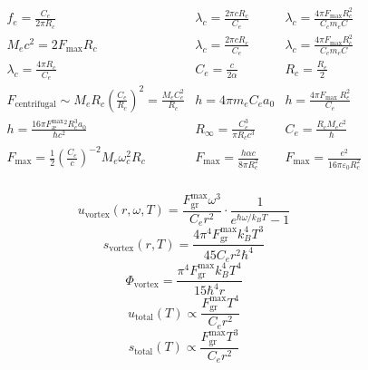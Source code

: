 \begin{gather*}
    \begin{array}{ccc}
            f_e = \frac{C_e}{2 \pi R_c} & \lambda_c = \frac{2 \pi c R_c}{C_e} & \lambda_c = \frac{4 \pi F_{\max } R_c^2}{C_e m_e C} \\
            M_e c^2 = 2 F_{\max } R_c & \lambda_c = \frac{2 \pi c R_c}{C_e} & \lambda_c = \frac{4 \pi F_{\max } R_c^2}{C_e m_e C} \\
            \lambda_c = \frac{4 \pi R_c}{C_e} & C_e = \frac{c}{2 \alpha} & R_c = \frac{R_e}{2} \\
            F_\text{centrifugal} \sim M_e R_c \left(\frac{C_e}{R_c}\right)^2 = \frac{M_e C_e^2}{R_c} & h = 4 \pi m_e C_e a_0 & h = \frac{4 \pi F_\text {max } R_e^2}{C_e} \\
            h = \frac{16 \pi F^{\text{max}}_{\text{\ae}}^2 R_c^3 a_0}{\hbar c^2} & R_\infty = \frac{C_e^3}{\pi R_c c^3} & C_e = \frac{R_c M_e c^2}{\hbar} \\
            F_{\max} = \frac{1}{2} \left( \frac{C_e}{c} \right)^{-2} M_e \omega_c^2 R_c & F_{\max} = \frac{h \alpha c}{8 \pi R_c^2} & F_{\max} = \frac{e^2}{16 \pi \varepsilon_0 R_c^2} \\
    \end{array}
\end{gather*}

\begin{equation*}
    u_\text{vortex}(r, \omega, T) = \frac{F^{\text{max}}_{\text{gr}} \omega^3}{C_e r^2} \cdot \frac{1}{e^{\hbar \omega / k_B T} - 1}
\end{equation*}
\begin{equation*}
    s_\text{vortex}(r, T) = \frac{4 \pi^4 F^{\text{max}}_{\text{gr}} k_B^4 T^3}{45 C_e r^2 \hbar^4}
\end{equation*}
\begin{equation*}
    \Phi_\text{vortex} = \frac{\pi^4 F^{\text{max}}_{\text{gr}} k_B^4 T^4}{15 \hbar^4 r}
\end{equation*}
\begin{equation*}
    u_\text{total}(T) \propto \frac{F^{\text{max}}_{\text{gr}} T^4}{C_e r^2}
\end{equation*}
\begin{equation*}
    s_\text{total}(T) \propto \frac{F^{\text{max}}_{\text{gr}} T^3}{C_e r^2}
\end{equation*}




